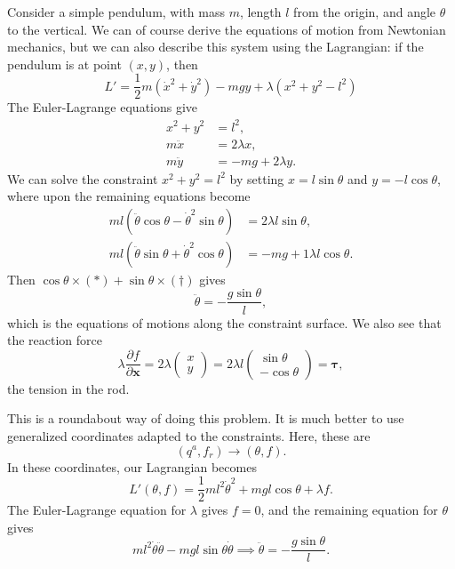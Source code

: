 \documentclass[12pt]{article}
\begin{document}
Consider a simple pendulum, with mass $m$, length $l$ from the origin, and angle $\theta$ to the vertical. We can of course derive the equations of motion from Newtonian mechanics, but we can also describe this system using the Lagrangian: if the pendulum is at point $(x, y)$, then
\[
L' = \frac{1}{2}m(\dot x^2 + \dot y^2) - mgy + \lambda(x^2 + y^2 - l^2)
\]
The Euler-Lagrange equations give
\begin{align*}
	x^2 + y^2 &= l^2, \\
	m\ddot x &= 2\lambda x, \\
	m\ddot y &= -mg + 2\lambda y.
\end{align*}
We can solve the constraint $x^2 + y^2 = l^2$ by setting $x = l \sin \theta$ and $y = -l \cos \theta$, where upon the remaining equations become
\begin{align*}
	ml(\ddot \theta \cos \theta - \dot \theta^2 \sin \theta) &= 2 \lambda l \sin \theta, \tag{$\ast$}\\
	ml(\ddot \theta \sin \theta + \dot \theta^2 \cos \theta) &= - mg + 1\lambda l \cos \theta. \tag{$\dagger$}
\end{align*}
Then $\cos \theta \times (\ast) + \sin \theta \times (\dagger)$ gives
\[
\ddot \theta = - \frac{g \sin \theta}{l},
\]
which is the equations of motions along the constraint surface. We also see that the reaction force
\[
\lambda \frac{\partial f}{\partial \mathbf{x}} = 2 \lambda
\begin{pmatrix}
	x \\ y
\end{pmatrix}
 = 2 \lambda l
 \begin{pmatrix}
 	\sin \theta \\ - \cos \theta
 \end{pmatrix}
  = \bm{\tau},
\]
the tension in the rod.

This is a roundabout way of doing this problem. It is much better to use generalized coordinates adapted to the constraints. Here, these are
\[
	(q^a, f_r) \to (\theta, f).
\]
In these coordinates, our Lagrangian becomes
\[
L'(\theta, f) = \frac{1}{2} m l^2 \dot \theta^2 + mgl \cos \theta + \lambda f.
\]
The Euler-Lagrange equation for $\lambda$ gives $f = 0$, and the remaining equation for $\theta$ gives
\[
m l^2 \dot \theta \ddot \theta - mgl \sin \theta \dot \theta \implies \ddot \theta = - \frac{g \sin \theta}{l}.
\]
\end{document}
